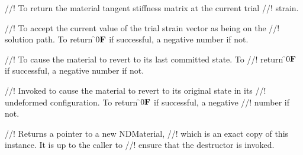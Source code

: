 //! To return the material tangent stiffness matrix at the current trial
//! strain.

//! To accept the current value of the trial strain vector as being on the
//! solution path. To return \f$0{\bf F}$ if successful, a negative number if not.

//! To cause the material to revert to its last committed state. To
//! return \f$0{\bf F}$ if successful, a negative number if not.

//! Invoked to cause the material to revert to its original state in its
//! undeformed configuration. To return \f$0{\bf F}$ if successful, a negative
//! number if not.

//! Returns a pointer to a new NDMaterial,
//! which is an exact copy of this instance. It is up to the caller to
//! ensure that the destructor is invoked.
